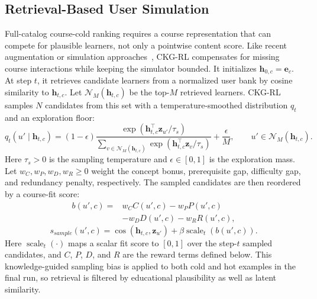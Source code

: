 \documentclass[letterpaper]{article}
\begin{document}
\subsection{Retrieval-Based User Simulation}
Full-catalog course-cold ranking requires a course representation that can compete for plausible learners, not only a pointwise content score. Like recent augmentation or simulation approaches~\cite{wang2024llmaugmenter,huang2025coldllm}, CKG-RL compensates for missing course interactions while keeping the simulator bounded. It initializes \(\mathbf{h}_{0,c}=\mathbf{e}_c\). At step \(t\), it retrieves candidate learners from a normalized user bank by cosine similarity to \(\mathbf{h}_{t,c}\). Let \(\mathcal{N}_M(\mathbf{h}_{t,c})\) be the top-\(M\) retrieved learners. CKG-RL samples \(N\) candidates from this set with a temperature-smoothed distribution \(q_t\) and an exploration floor:
\begin{equation}
q_t(u'\mid \mathbf{h}_{t,c})=
(1-\epsilon)\frac{\exp(\mathbf{h}_{t,c}^\top\mathbf{z}_{u'}/\tau_s)}
{\sum_{v\in\mathcal{N}_M(\mathbf{h}_{t,c})}\exp(\mathbf{h}_{t,c}^\top\mathbf{z}_{v}/\tau_s)}
+\frac{\epsilon}{M},\qquad u'\in\mathcal{N}_M(\mathbf{h}_{t,c}).
\end{equation}
Here \(\tau_s>0\) is the sampling temperature and \(\epsilon\in[0,1]\) is the exploration mass. Let \(w_C,w_P,w_D,w_R\geq0\) weight the concept bonus, prerequisite gap, difficulty gap, and redundancy penalty, respectively. The sampled candidates are then reordered by a course-fit score:
\begin{equation}
\begin{aligned}
b(u',c)=&
w_C C(u',c)-w_P P(u',c)\\
&-w_D D(u',c)-w_R R(u',c),
\end{aligned}
\end{equation}
\begin{equation}
s_{sample}(u',c)=
\cos(\mathbf{h}_{t,c},\mathbf{z}_{u'})
+\beta\operatorname{scale}_t(b(u',c)).
\end{equation}
Here \(\operatorname{scale}_t(\cdot)\) maps a scalar fit score to \([0,1]\) over the step-\(t\) sampled candidates, and \(C\), \(P\), \(D\), and \(R\) are the reward terms defined below. This knowledge-guided sampling bias is applied to both cold and hot examples in the final run, so retrieval is filtered by educational plausibility as well as latent similarity.
\end{document}
